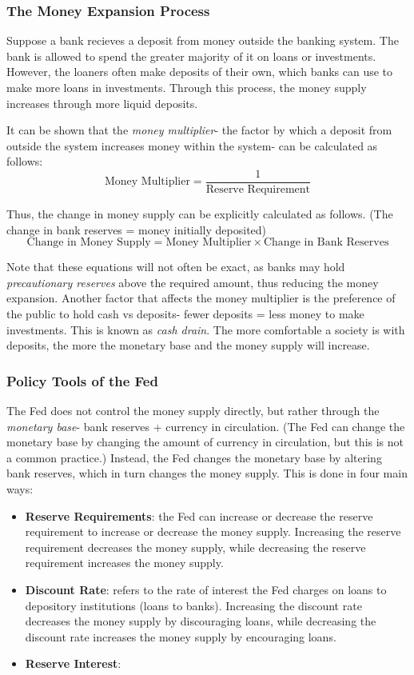 \documentclass[12pt, a4paper]{article}
\theoremstyle{definition}
\begin{document}
\subsubsection{The Money Expansion Process}
Suppose a bank recieves a deposit from money outside the banking system.
The bank is allowed to spend the greater majority of it on loans or investments.
However, the loaners often make deposits of their own, which banks can use to make more loans in investments.
Through this process, the money supply increases through more liquid deposits.

It can be shown that the \textit{money multiplier}- the factor by which a deposit from outside the system increases money within the system- can be calculated as follows:
\[\textrm{Money Multiplier} = \frac{1}{\textrm{Reserve Requirement}}\]

Thus, the change in money supply can be explicitly calculated as follows.
(The change in bank reserves = money initially deposited)
\[\textrm{Change in Money Supply} = \textrm{Money Multiplier} \times \textrm{Change in Bank Reserves}\]

Note that these equations will not often be exact, as banks may hold \textit{precautionary reserves} above the required amount, thus reducing the money expansion.
Another factor that affects the money multiplier is the preference of the public to hold cash vs deposits- fewer deposits = less money to make investments.
This is known as \textit{cash drain}.
The more comfortable a society is with deposits, the more the monetary base and the money supply will increase.

\subsubsection{Policy Tools of the Fed}
The Fed does not control the money supply directly, but rather through the \textit{monetary base}- bank reserves + currency in circulation.
(The Fed can change the monetary base by changing the amount of currency in circulation, but this is not a common practice.)
Instead, the Fed changes the monetary base by altering bank reserves, which in turn changes the money supply.
This is done in four main ways:
\begin{itemize}
    \item \textbf{Reserve Requirements}: the Fed can increase or decrease the reserve requirement to increase or decrease the money supply. Increasing the reserve requirement decreases the money supply, while decreasing the reserve requirement increases the money supply.
    \item \textbf{Discount Rate}: refers to the rate of interest the Fed charges on loans to depository institutions (loans to banks). Increasing the discount rate decreases the money supply by discouraging loans, while decreasing the discount rate increases the money supply by encouraging loans.
    \item \textbf{Reserve Interest}: 
\end{itemize}
\end{document}
